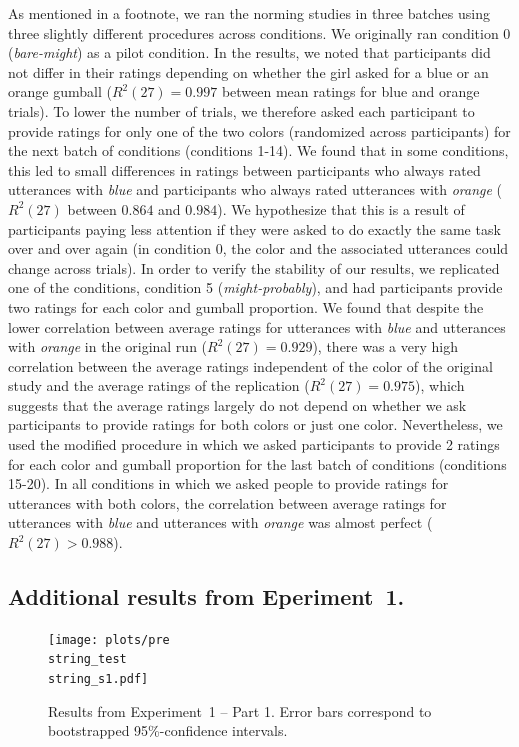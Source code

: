 \documentclass[man, floatsintext]{apa6}
\begin{document}
As mentioned in a footnote, we ran the norming studies in three batches using three slightly different procedures across conditions. We originally ran condition 0 (\emph{bare-might}) as a pilot condition. In the results, we noted that participants did not differ in their ratings depending on whether the girl asked for a blue or an orange gumball ($R^2(27)=0.997$ between mean ratings for blue and orange trials). To lower the number of trials, we therefore asked each participant to provide ratings for only one of the two colors (randomized across participants) for the next batch of conditions (conditions 1-14). We found that in some conditions, this led to small differences in ratings between participants who always rated utterances with \emph{blue} and participants who always rated utterances with \textit{orange} ($R^2(27)$ between $0.864$ and $0.984$). We hypothesize that this is a result of participants paying less attention if they were asked to do exactly the same task over and over again (in condition 0, the color and the associated utterances could change across trials). In order to verify the stability of our results, we replicated one of the conditions, condition 5 (\emph{might-probably}), and had participants provide two ratings for each color and gumball proportion. We found that despite the lower correlation between average ratings for utterances with \emph{blue} and utterances with \emph{orange} in the original run ($R^2(27)=0.929$), there was a very high correlation between the average ratings independent of the color of the original study and the average ratings of the replication ($R^2(27)=0.975$), which suggests that the average ratings largely do not depend on whether we ask participants to provide ratings for both colors or just one color. Nevertheless, we used the modified procedure in which we asked participants to provide 2 ratings for each color and gumball proportion for the last batch of conditions (conditions 15-20). In all conditions in which we asked people to provide ratings for utterances with both colors, the correlation between average ratings for utterances with \emph{blue} and utterances with \emph{orange} was almost perfect ($R^2(27)>0.988$).

\subsection*{Additional results from Eperiment~1.}

\begin{figure}[h!]
\texttt{[image: plots/pre\\string\_test\\string\_s1.pdf]}
\caption{Results from Experiment~1 -- Part 1. Error bars correspond to bootstrapped 95\%-confidence intervals. \label{fig:norming-results-1}}
\end{figure}
\end{document}
